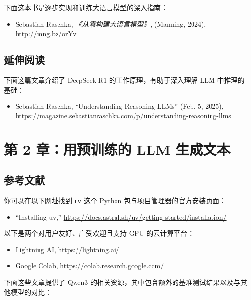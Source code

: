 下面这本书是逐步实现和训练大语言模型的深入指南：

\begin{itemize}
\item Sebastian Raschka, \emph{《从零构建大语言模型》}, (Manning, 2024), \href{http://mng.bz/orYv}{http://mng.bz/orYv}
\end{itemize}

\subsection{延伸阅读}

下面这篇文章介绍了 DeepSeek-R1 的工作原理，有助于深入理解 LLM 中推理的基础：

\begin{itemize}
\item Sebastian Raschka, “Understanding Reasoning LLMs” (Feb. 5, 2025), \href{https://magazine.sebastianraschka.com/p/understanding-reasoning-llms}{https://magazine.sebastianraschka.com/p/understanding-reasoning-llms}
\end{itemize}

\section{第 2 章：用预训练的 LLM 生成文本}

\subsection{参考文献}

你可以在以下网址找到 \texttt{uv} 这个 Python 包与项目管理器的官方安装页面：

\begin{itemize}
\item “Installing uv,” \href{https://docs.astral.sh/uv/getting-started/installation/}{https://docs.astral.sh/uv/getting-started/installation/}
\end{itemize}

以下是两个对用户友好、广受欢迎且支持 GPU 的云计算平台：

\begin{itemize}
\item Lightning AI, \href{https://lightning.ai/}{https://lightning.ai/}
\item Google Colab, \href{https://colab.research.google.com/}{https://colab.research.google.com/}
\end{itemize}

下面这些文章提供了 Qwen3 的相关资源，其中包含额外的基准测试结果以及与其他模型的对比：


